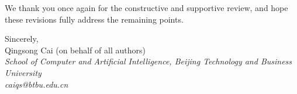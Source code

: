 \documentclass[11pt]{article}
\begin{document}
\vspace{0.6em}
We thank you once again for the constructive and supportive review, and hope
these revisions fully address the remaining points.

\vspace{0.8em}
Sincerely,\\
Qingsong Cai (on behalf of all authors)\\
\textit{School of Computer and Artificial Intelligence, Beijing Technology and
Business University}\\
\textit{caiqs@btbu.edu.cn}
\end{document}

